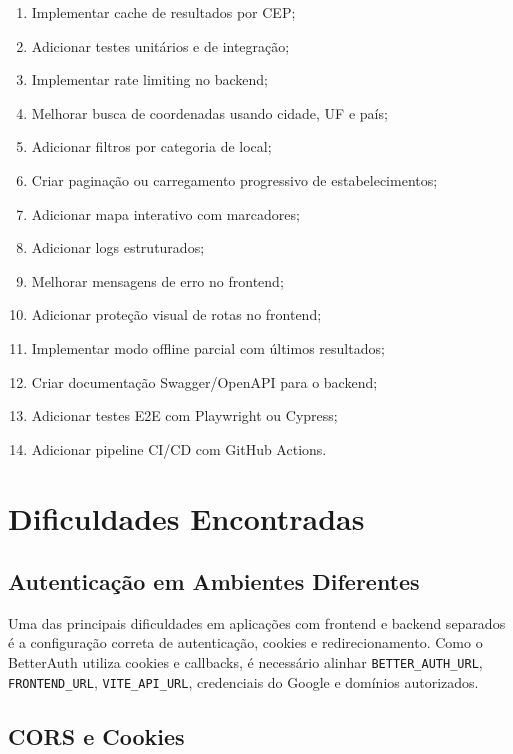 \documentclass[
    12pt,
    oneside,
    openright,
    a4paper,
    english,
    brazil
]{abntex2}
\begin{document}
\begin{enumerate}
    \item Implementar cache de resultados por CEP;
    \item Adicionar testes unitários e de integração;
    \item Implementar rate limiting no backend;
    \item Melhorar busca de coordenadas usando cidade, UF e país;
    \item Adicionar filtros por categoria de local;
    \item Criar paginação ou carregamento progressivo de estabelecimentos;
    \item Adicionar mapa interativo com marcadores;
    \item Adicionar logs estruturados;
    \item Melhorar mensagens de erro no frontend;
    \item Adicionar proteção visual de rotas no frontend;
    \item Implementar modo offline parcial com últimos resultados;
    \item Criar documentação Swagger/OpenAPI para o backend;
    \item Adicionar testes E2E com Playwright ou Cypress;
    \item Adicionar pipeline CI/CD com GitHub Actions.
\end{enumerate}


\chapter{Dificuldades Encontradas}

\section{Autenticação em Ambientes Diferentes}

Uma das principais dificuldades em aplicações com frontend e backend separados é a configuração correta de autenticação, cookies e redirecionamento. Como o BetterAuth utiliza cookies e callbacks, é necessário alinhar \texttt{BETTER\_AUTH\_URL}, \texttt{FRONTEND\_URL}, \texttt{VITE\_API\_URL}, credenciais do Google e domínios autorizados.

\section{CORS e Cookies}
\end{document}

